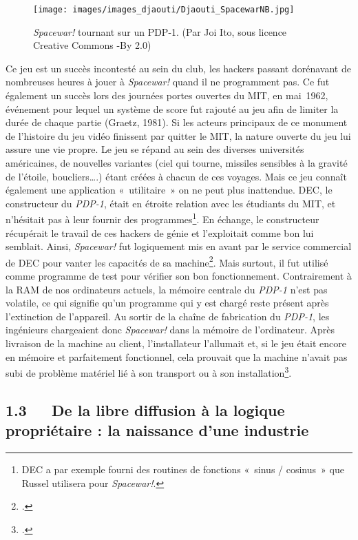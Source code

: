 \documentclass{FramateX}
\begin{document}
\begin{refsection}
\begin{figure}
\centering
\texttt{[image: images/images\_djaouti/Djaouti\_SpacewarNB.jpg]}
\caption{\textit{Spacewar!} tournant sur un PDP-1. (Par Joi Ito, sous licence Creative Commons -By 2.0)}
\end{figure}

Ce jeu est un succès incontesté au sein du club, les hackers passant
dorénavant de nombreuses heures à jouer à \textit{Spacewar!} quand il ne programment
pas. Ce fut également un succès lors des journées portes ouvertes du
MIT, en mai~1962, événement pour lequel un système de score fut rajouté
au jeu afin de limiter la durée de chaque partie (Graetz, 1981). Si les
acteurs principaux de ce monument de l'histoire du jeu vidéo finissent
par quitter le MIT, la nature ouverte du jeu lui assure une vie propre.
Le jeu se répand au sein des diverses universités américaines, de
nouvelles variantes (ciel qui tourne, missiles sensibles à la gravité
de l'étoile, boucliers….) étant créées à chacun de ces voyages. Mais ce
jeu connaît également une application «~utilitaire~» on ne peut plus
inattendue. DEC, le constructeur du \textit{PDP-1}, était en étroite relation
avec les étudiants du MIT, et n'hésitait pas à leur fournir des
programmes\footnote{DEC a par exemple
fourni des routines de fonctions «~sinus / cosinus~» que Russel
utilisera pour \textit{Spacewar!}.}. En échange, le constructeur
récupérait le travail de ces hackers de génie et l'exploitait comme bon
lui semblait. Ainsi, \textit{Spacewar!} fut
logiquement mis en avant par le service commercial de DEC  pour vanter les capacités de sa
machine\footnote{\cite{chaplinsmartbomb2005}.}. Mais surtout, il fut utilisé comme
programme de test pour vérifier son bon fonctionnement. Contrairement à
la RAM de nos ordinateurs actuels, la mémoire centrale du
\textit{PDP-1} n'est pas volatile, ce qui
signifie qu'un programme qui y est chargé reste présent après
l'extinction de l'appareil. Au sortir de la chaîne de fabrication du
\textit{PDP-1}, les ingénieurs chargeaient
donc \textit{Spacewar!} dans la mémoire de
l'ordinateur. Après livraison de la machine au client, l'installateur
l'allumait et, si le jeu était encore en mémoire et parfaitement
fonctionnel, cela prouvait que la machine n'avait pas subi de problème
matériel lié à son transport ou à son installation\footnote{\cite{levyhackers1994}.}.

\subsection*{1.3~~~De la libre diffusion à la logique propriétaire : la naissance d'une industrie}
{}



\end{refsection}
\end{document}
